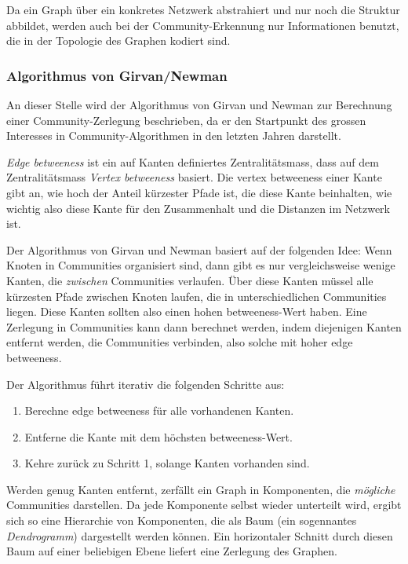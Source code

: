 Da ein Graph \"uber ein konkretes Netzwerk abstrahiert und nur noch
die Struktur abbildet, werden auch bei der Community-Erkennung nur
Informationen benutzt, die in der Topologie des Graphen kodiert sind. 

\subsubsection{Algorithmus von Girvan/Newman}
\label{sec:algor-von-girv-1}

An dieser Stelle wird der Algorithmus von Girvan
und Newman\cite{Newman2004} zur Berechnung einer Community-Zerlegung
beschrieben, da er den Startpunkt des grossen Interesses in
Community-Algorithmen in den letzten Jahren darstellt.

\emph{Edge betweeness} ist ein auf Kanten definiertes
Zentralit\"atsmass, dass auf dem Zentralit\"atsmass \emph{Vertex
  betweeness}\cite{Koschutzki2004a} basiert. Die vertex betweeness
einer Kante gibt an, wie hoch der Anteil k\"urzester Pfade ist, die
diese Kante beinhalten, wie wichtig also diese Kante f\"ur den
Zusammenhalt und die Distanzen im Netzwerk ist.

Der Algorithmus von Girvan und Newman basiert auf der folgenden Idee:
Wenn Knoten in Communities organisiert sind, dann gibt es nur
vergleichsweise wenige Kanten, die \emph{zwischen} Communities
verlaufen. \"Uber diese Kanten m\"ussel alle k\"urzesten Pfade
zwischen Knoten laufen, die in unterschiedlichen Communities
liegen. Diese Kanten sollten also einen hohen betweeness-Wert
haben. Eine Zerlegung in Communities kann dann berechnet werden, indem
diejenigen Kanten entfernt werden, die Communities verbinden, also
solche mit hoher edge betweeness.

Der Algorithmus f\"uhrt iterativ die folgenden Schritte aus:

\begin{enumerate}
\item Berechne edge betweeness f\"ur alle vorhandenen Kanten.
\item Entferne die Kante mit dem h\"ochsten betweeness-Wert.
\item Kehre zur\"uck zu Schritt 1, solange Kanten vorhanden sind.
\end{enumerate}

Werden genug Kanten entfernt, zerf\"allt ein Graph in Komponenten, die
\emph{m\"ogliche} Communities darstellen. Da jede Komponente selbst
wieder unterteilt wird, ergibt sich so eine Hierarchie von
Komponenten, die als Baum (ein sogennantes \emph{Dendrogramm})
dargestellt werden k\"onnen. Ein horizontaler Schnitt durch diesen
Baum auf einer beliebigen Ebene liefert eine Zerlegung des Graphen.

